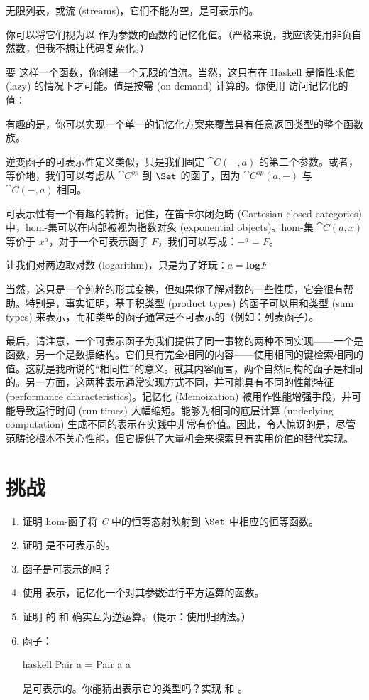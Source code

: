 无限列表，或流 (streams)，它们不能为空，是可表示的。

你可以将它们视为以  作为参数的函数的记忆化值。（严格来说，我应该使用非负自然数，但我不想让代码复杂化。）

要  这样一个函数，你创建一个无限的值流。当然，这只有在 Haskell 是惰性求值 (lazy) 的情况下才可能。值是按需 (on demand) 计算的。你使用  访问记忆化的值：

有趣的是，你可以实现一个单一的记忆化方案来覆盖具有任意返回类型的整个函数族。

逆变函子的可表示性定义类似，只是我们固定 $\cat{C}(-, a)$ 的第二个参数。或者，等价地，我们可以考虑从 $\cat{C}^\mathit{op}$ 到 $\Set$ 的函子，因为 $\cat{C}^\mathit{op}(a, -)$ 与 $\cat{C}(-, a)$ 相同。

可表示性有一个有趣的转折。记住，在笛卡尔闭范畴 (Cartesian closed categories) 中，hom-集可以在内部被视为指数对象 (exponential objects)。hom-集 $\cat{C}(a, x)$ 等价于 $x^a$，对于一个可表示函子 $F$，我们可以写成：$-^a = F$。

让我们对两边取对数 (logarithm)，只是为了好玩：$a = \mathbf{log}F$

当然，这只是一个纯粹的形式变换，但如果你了解对数的一些性质，它会很有帮助。特别是，事实证明，基于积类型 (product types) 的函子可以用和类型 (sum types) 来表示，而和类型的函子通常是不可表示的（例如：列表函子）。

最后，请注意，一个可表示函子为我们提供了同一事物的两种不同实现——一个是函数，另一个是数据结构。它们具有完全相同的内容——使用相同的键检索相同的值。这就是我所说的“相同性”的意义。就其内容而言，两个自然同构的函子是相同的。另一方面，这两种表示通常实现方式不同，并可能具有不同的性能特征 (performance characteristics)。记忆化 (Memoization) 被用作性能增强手段，并可能导致运行时间 (run times) 大幅缩短。能够为相同的底层计算 (underlying computation) 生成不同的表示在实践中非常有价值。因此，令人惊讶的是，尽管范畴论根本不关心性能，但它提供了大量机会来探索具有实用价值的替代实现。

\section{挑战}

\begin{enumerate}
  \tightlist
  \item
        证明 hom-函子将 \emph{C} 中的恒等态射映射到 $\Set$ 中相应的恒等函数。
  \item
        证明  是不可表示的。
  \item
         函子是可表示的吗？
  \item
        使用  表示，记忆化一个对其参数进行平方运算的函数。
  \item
        证明  的  和  确实互为逆运算。（提示：使用归纳法。）
  \item
        函子：

        \begin{snip}{haskell}
Pair a = Pair a a
\end{snip}
        是可表示的。你能猜出表示它的类型吗？实现  和 。
\end{enumerate}

